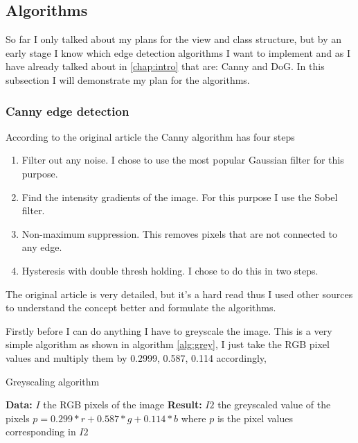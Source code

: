 \subsection{Algorithms}
\label{chap:algo}

So far I only talked about my plans for the view and class structure, but by an early stage I know which edge detection algorithms I want to implement and as I have already talked about in \autoref{chap:intro} that are: \ac{Canny} and \ac{DoG}. In this subsection I will demonstrate my plan for the algorithms.

\subsubsection{Canny edge detection}

According to the original article\cite{canny:paper} the \ac{Canny} algorithm has four steps

\begin{enumerate}[nolistsep]
\item Filter out any noise. I chose to use the most popular Gaussian filter for this purpose.
\item Find the intensity gradients of the image. For this purpose I use the Sobel filter.
\item Non-maximum suppression. This removes pixels that are not connected to any edge.
\item Hysteresis with double thresh holding. I chose to do this in two steps.
\end{enumerate}

The original article\cite{canny:paper} is very detailed, but it's a hard read thus I used other sources\cite{canny:imp}\cite{canny:imp2} to understand the concept better and formulate the algorithms.

Firstly before I can do anything I have to greyscale the image. This is a very simple algorithm as shown in algorithm \ref{alg:grey}, I just take the RGB pixel values and multiply them by 0.2999, 0.587, 0.114 accordingly,

\begin{algorithm}[H]
\caption{Greyscaling algorithm}
\label{alg:grey}
\begin{algorithmic}
\State \textbf{Data:} $I$ the RGB pixels of the image
\State \textbf{Result:} $I2$ the greyscaled value of the pixels
\State $p = 0.299 * r + 0.587 * g + 0.114 * b$
\State where $p$ is the pixel values corresponding in $I2$
\EndFor
\end{algorithmic}
\end{algorithm}


